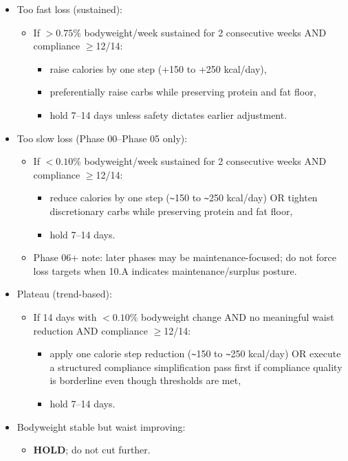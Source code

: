 \documentclass[10pt]{article}
\begin{document}
\begin{itemize}
\item Too fast loss (sustained):
\begin{itemize}
\item If $>0.75\%$ bodyweight/week sustained for 2 consecutive weeks AND compliance $\geq$12/14:
\begin{itemize}
\item raise calories by one step (+150 to +250 kcal/day),
\item preferentially raise carbs while preserving protein and fat floor,
\item hold 7–14 days unless safety dictates earlier adjustment.
\end{itemize}
\end{itemize}
\item Too slow loss (Phase 00–Phase 05 only):
\begin{itemize}
\item If $<0.10\%$ bodyweight/week sustained for 2 consecutive weeks AND compliance $\geq$12/14:
\begin{itemize}
\item reduce calories by one step (\verb|~|150 to \verb|~|250 kcal/day) OR tighten discretionary carbs while preserving protein and fat floor,
\item hold 7–14 days.
\end{itemize}
\item Phase 06+ note: later phases may be maintenance-focused; do not force loss targets when 10.A indicates maintenance/surplus posture.
\end{itemize}
\item Plateau (trend-based):
\begin{itemize}
\item If 14 days with $<0.10\%$ bodyweight change AND no meaningful waist reduction AND compliance $\geq$12/14:
\begin{itemize}
\item apply one calorie step reduction (\verb|~|150 to \verb|~|250 kcal/day) OR execute a structured compliance simplification pass first if compliance quality is borderline even though thresholds are met,
\item hold 7–14 days.
\end{itemize}
\end{itemize}
\item Bodyweight stable but waist improving:
\begin{itemize}
\item \textbf{HOLD}; do not cut further.

\end{itemize}
\end{itemize}
\end{document}
